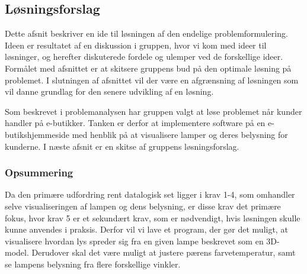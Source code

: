 \subsection{Løsningsforslag}
\label{sec:losning}
Dette afsnit beskriver en ide til løsningen af den endelige problemformulering. Ideen er resultatet af en diskussion i gruppen, hvor vi kom med ideer til løsninger, og herefter diskuterede fordele og ulemper ved de forskellige ideer. Formålet med afsnittet er at skitsere gruppens bud på den optimale løsning på problemet. I slutningen af afsnittet vil der være en afgrænsning af løsningen som vil danne grundlag for den senere udvikling af en løsning.

Som beskrevet i problemanalysen har gruppen valgt at løse problemet når kunder handler på e-butikker. Tanken er derfor at implementere software på en e-butikshjemmeside med henblik på at visualisere lamper og deres belysning for kunderne. I næste afsnit er en skitse af gruppens løsningsforslag.





\subsubsection*{Opsummering}

Da den primære udfordring rent datalogisk set ligger i krav 1-4, som omhandler selve visualiseringen af lampen og dens belysning, er disse krav det primære fokus, hvor krav 5 er et sekundært krav, som er nødvendigt, hvis løsningen skulle kunne anvendes i praksis. Derfor vil vi lave et program, der gør det muligt, at visualisere hvordan lys spreder sig fra en given lampe beskrevet som en 3D-model. Derudover skal det være muligt at justere pærens farvetemperatur, samt se lampens belysning fra flere forskellige vinkler. 
